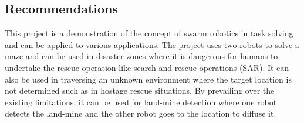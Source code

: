 \subsection{Recommendations}
This project is a demonstration of the concept of swarm robotics in task solving and can be applied to various applications. The project uses two robots to solve a maze and can be used in disaster zones where it is dangerous for humans to undertake the rescue operation like search and rescue operations (SAR). It can also be used in traversing an unknown environment where the target location is not determined such as in hostage rescue situations. By prevailing over the existing
limitations, it can be used for land-mine detection where one robot detects the land-mine and the other robot goes to the location to diffuse it.
